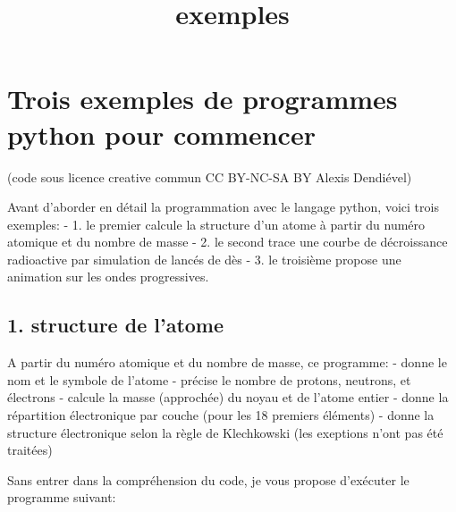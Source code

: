 \documentclass[11pt]{article}
\title{exemples}
\begin{document}
    
    
    \maketitle
    
    

    
    \hypertarget{trois-exemples-de-programmes-python-pour-commencer}{%
\section{Trois exemples de programmes python pour
commencer}\label{trois-exemples-de-programmes-python-pour-commencer}}

(code sous licence creative commun CC BY-NC-SA BY Alexis Dendiével)

Avant d'aborder en détail la programmation avec le langage python, voici
trois exemples: - 1. le premier calcule la structure d'un atome à partir
du numéro atomique et du nombre de masse - 2. le second trace une courbe
de décroissance radioactive par simulation de lancés de dès - 3. le
troisième propose une animation sur les ondes progressives.

\hypertarget{structure-de-latome}{%
\subsection{1. structure de l'atome}\label{structure-de-latome}}

A partir du numéro atomique et du nombre de masse, ce programme: - donne
le nom et le symbole de l'atome - précise le nombre de protons,
neutrons, et électrons - calcule la masse (approchée) du noyau et de
l'atome entier - donne la répartition électronique par couche (pour les
18 premiers éléments) - donne la structure électronique selon la règle
de Klechkowski (les exeptions n'ont pas été traitées)

Sans entrer dans la compréhension du code, je vous propose d'exécuter le
programme suivant:
\end{document}
